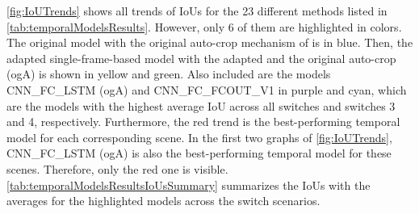 \autoref{fig:IoUTrends} shows all trends of \ac{IoU}s for the 23 different methods listed in \autoref{tab:temporalModelsResults}.
However, only 6 of them are highlighted in colors.
The original model with the original auto-crop mechanism of \cite{tepNet2024} is in blue.
Then, the adapted single-frame-based model with the adapted and the original auto-crop (ogA) is shown in yellow and green.
Also included are the models CNN\_FC\_LSTM (ogA) and CNN\_FC\_FCOUT\_V1 in purple and cyan, which are the models with the highest average \ac{IoU} across all switches and switches 3 and 4, respectively.
Furthermore, the red trend is the best-performing temporal model for each corresponding scene.
In the first two graphs of \autoref{fig:IoUTrends}, CNN\_FC\_LSTM (ogA) is also the best-performing temporal model for these scenes.
Therefore, only the red one is visible.
\autoref{tab:temporalModelsResultsIoUsSummary} summarizes the \ac{IoU}s with the averages for the highlighted models across the switch scenarios.

%
%
%


